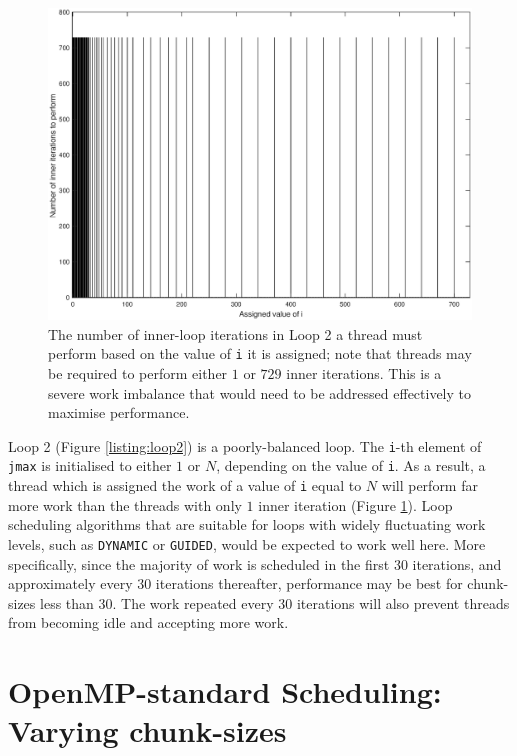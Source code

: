 \documentclass{article} %
\newcommand{\tp}{\texttt}
\begin{document}
\begin{figure}
    \centering
        \includegraphics[height=.3\textheight]{part1_plots/loop2_balancing.eps}
        \caption{The number of inner-loop iterations in Loop 2 a thread must perform based on the value of \tp{i} it is assigned; note that threads may be required to perform either $1$ or $729$ inner iterations. This is a severe work imbalance that would need to be addressed effectively to maximise performance.}
        \label{fig:loop2work}
\end{figure}

Loop 2 (Figure \ref{listing:loop2}) is a poorly-balanced loop.
The \texttt{i}-th element of \texttt{jmax} is initialised to either $1$ or $N$, depending on the value of \texttt{i}.
As a result, a thread which is assigned the work of a value of \texttt{i} equal to $N$ will perform far more work than the threads with only $1$ inner iteration (Figure \ref{fig:loop2work}).
Loop scheduling algorithms that are suitable for loops with widely fluctuating work levels, such as \tp{DYNAMIC} or \tp{GUIDED}, would be expected to work well here.
More specifically, since the majority of work is scheduled in the first 30 iterations, and approximately every 30 iterations thereafter, performance may be best for chunk-sizes less than 30.
The work repeated every 30 iterations will also prevent threads from becoming idle and accepting more work.

\section*{OpenMP-standard Scheduling: Varying chunk-sizes}
\end{document}
